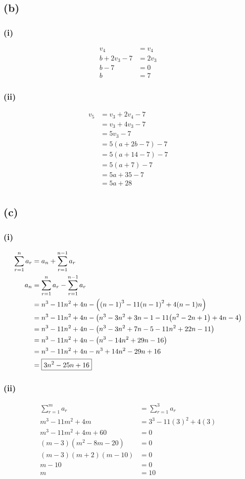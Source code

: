 \documentclass[a4paper,12pt]{article}
\begin{document}
\subsection*{(b)}
\subsubsection*{(i)}
\[\begin{aligned}
    v_4&=v_4\\
    b+2v_3-7&=2v_3\\
    b-7&=0\\
    b&=\boxed7
\end{aligned}\]
\subsubsection*{(ii)}
\[\begin{aligned}
    v_5&=v_3+2v_4-7\\
       &=v_3+4v_3-7\\
       &=5v_3-7\\
       &=5(a+2b-7)-7\\
       &=5(a+14-7)-7\\
       &=5(a+7)-7\\
       &=5a+35-7\\
       &=\boxed{5a+28}\\
\end{aligned}\]
\subsection*{(c)}
\subsubsection*{(i)}
\[\begin{aligned}
    \sum_{r=1}^n{a_r}&=a_n+\sum_{r=1}^{n-1}{a_r}\\
    a_n&=\sum_{r=1}^n{a_r}-\sum_{r=1}^{n-1}{a_r}\\
      &=n^3-11n^2+4n-\pqty{{(n-1)}^3-11{(n-1)}^2+4(n-1)n}\\
      &=n^3-11n^2+4n-\pqty{n^3-3n^2+3n-1-11\pqty{n^2-2n+1}+4n-4}\\
      &=n^3-11n^2+4n-\pqty{n^3-3n^2+7n-5-11n^2+22n-11}\\
      &=n^3-11n^2+4n-\pqty{n^3-14n^2+29n-16}\\
      &=n^3-11n^2+4n-n^3+14n^2-29n+16\\
      &=\boxed{3n^2-25n+16}
\end{aligned}\]
\subsubsection*{(ii)}
\[\begin{aligned}
    \sum_{r=1}^m{a_r}&=\sum_{r=1}^3{a_r}\\
    m^3-11m^2+4m&=3^3-11{(3)}^2+4(3)\\
    m^3-11m^2+4m+60&=0\\
    (m-3)\left(m^2-8m-20\right)&=0\\
    (m-3)(m+2)(m-10)&=0\\
    m-10&=0\\
    m&=\boxed{10}
\end{aligned}\]
\end{document}
